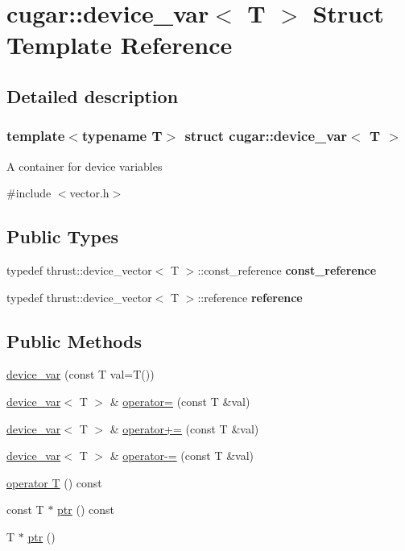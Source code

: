 \hypertarget{structcugar_1_1device__var}{}\section{cugar\+:\+:device\+\_\+var$<$ T $>$ Struct Template Reference}
\label{structcugar_1_1device__var}


\subsection{Detailed description}
\subsubsection*{template$<$typename T$>$\newline
struct cugar\+::device\+\_\+var$<$ T $>$}

A container for device variables 

{\ttfamily \#include $<$vector.\+h$>$}

\subsection*{Public Types}
\begin{DoxyCompactItemize}
\item 
typedef thrust\+::device\+\_\+vector$<$ T $>$\+::const\+\_\+reference {\bfseries const\+\_\+reference}
\item 
typedef thrust\+::device\+\_\+vector$<$ T $>$\+::reference {\bfseries reference}
\end{DoxyCompactItemize}
\subsection*{Public Methods}
\begin{DoxyCompactItemize}
\item 
\hyperlink{group___basic_ga011df6d3d281ae52a529e835ba1aad8e}{device\+\_\+var} (const T val=T())
\item 
\hyperlink{structcugar_1_1device__var}{device\+\_\+var}$<$ T $>$ \& \hyperlink{group___basic_ga760fb65c25c56b5fa9f49144f1da3f9b}{operator=} (const T \&val)
\item 
\hyperlink{structcugar_1_1device__var}{device\+\_\+var}$<$ T $>$ \& \hyperlink{group___basic_ga95f15b09320e473fc50c4df310d535fe}{operator+=} (const T \&val)
\item 
\hyperlink{structcugar_1_1device__var}{device\+\_\+var}$<$ T $>$ \& \hyperlink{group___basic_ga882c904bab742504bd555bd688ddcd07}{operator-\/=} (const T \&val)
\item 
\hyperlink{group___basic_ga64fde1bca016dd1b07ef0e7d6ef853ab}{operator T} () const
\item 
const T $\ast$ \hyperlink{group___basic_ga7075a2df5b4208648b803def09b239d1}{ptr} () const
\item 
T $\ast$ \hyperlink{group___basic_ga2073bcba54a5c135aa6dae8f0efbf20e}{ptr} ()
\end{DoxyCompactItemize}
